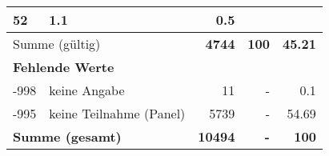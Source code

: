 \begin{longtable}{lXrrr}
       \num{52} &
       \num[round-mode=places,round-precision=2]{1,1} &
         \num[round-mode=places,round-precision=2]{0,5} \\
     \midrule
     \multicolumn{2}{l}{Summe (gültig)} &
       \textbf{\num{4744}} &
     \textbf{100} &
       \textbf{\num[round-mode=places,round-precision=2]{45,21}} \\
     \multicolumn{5}{l}{\textbf{Fehlende Werte}}\\
       -998 &
       keine Angabe &
         \num{11} &
        - &
         \num[round-mode=places,round-precision=2]{0,1} \\
       -995 &
       keine Teilnahme (Panel) &
         \num{5739} &
        - &
         \num[round-mode=places,round-precision=2]{54,69} \\
     \midrule
     \multicolumn{2}{l}{\textbf{Summe (gesamt)}} &
          \textbf{\num{10494}} &
        \textbf{-} &
        \textbf{100} \\
     \bottomrule
     \end{longtable}
     
